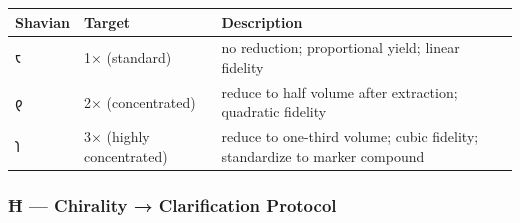 \documentclass[12pt,a4paper]{article}
\begin{document}
\begin{longtable}[]{@{}lll@{}}
\toprule
\begin{minipage}[b]{0.30\columnwidth}\raggedright
Shavian\strut
\end{minipage} & \begin{minipage}[b]{0.30\columnwidth}\raggedright
Target\strut
\end{minipage} & \begin{minipage}[b]{0.30\columnwidth}\raggedright
Description\strut
\end{minipage}\tabularnewline
\midrule
\endhead
\begin{minipage}[t]{0.30\columnwidth}\raggedright
𐑱\strut
\end{minipage} & \begin{minipage}[t]{0.30\columnwidth}\raggedright
1× (standard)\strut
\end{minipage} & \begin{minipage}[t]{0.30\columnwidth}\raggedright
no reduction; proportional yield; linear fidelity\strut
\end{minipage}\tabularnewline
\begin{minipage}[t]{0.30\columnwidth}\raggedright
𐑞\strut
\end{minipage} & \begin{minipage}[t]{0.30\columnwidth}\raggedright
2× (concentrated)\strut
\end{minipage} & \begin{minipage}[t]{0.30\columnwidth}\raggedright
reduce to half volume after extraction; quadratic fidelity\strut
\end{minipage}\tabularnewline
\begin{minipage}[t]{0.30\columnwidth}\raggedright
𐑐\strut
\end{minipage} & \begin{minipage}[t]{0.30\columnwidth}\raggedright
3× (highly concentrated)\strut
\end{minipage} & \begin{minipage}[t]{0.30\columnwidth}\raggedright
reduce to one-third volume; cubic fidelity; standardize to marker
compound\strut
\end{minipage}\tabularnewline
\bottomrule
\end{longtable}

\hypertarget{ux127-chirality-clarification-protocol}{%
\subsubsection{Ħ --- Chirality → Clarification
Protocol}\label{ux127-chirality-clarification-protocol}}
\end{document}

